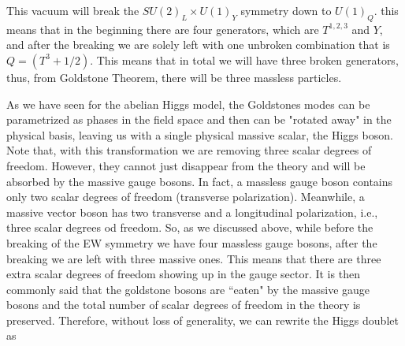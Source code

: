 This vacuum will break the $SU(2)_L \times U(1)_Y$ symmetry down to $U(1)_Q$. this means that in the beginning there are four generators, which are $T^{1,2,3}$ and $Y$, and after the breaking we are solely left with one unbroken combination that is $Q =  (T^3 + 1/2)$. This means that in total we will have three broken generators, thus, from Goldstone Theorem, there will be three massless particles. 

As we have seen for the abelian Higgs model, the Goldstones modes can be parametrized as phases in the field space and then can be "rotated away" in the physical basis, leaving us with a single physical massive scalar, the Higgs boson. Note that, with this transformation we are removing three scalar degrees of freedom.  However, they cannot just disappear from the theory and will be absorbed by the massive gauge bosons.
%
In fact, a massless gauge boson contains only two scalar degrees of freedom (transverse polarization). Meanwhile, a massive vector boson has two transverse and a longitudinal polarization, i.e., three scalar degrees od freedom. So, as we discussed above, while before the breaking of the EW symmetry we have four massless gauge bosons, after the breaking we are left with three massive ones. This means that there are three extra scalar degrees of freedom showing up in the gauge sector. It is then commonly said that the goldstone bosons are ``eaten" by the massive gauge bosons and the total number of scalar degrees of freedom in the theory is preserved. Therefore, without loss of generality, we can rewrite the Higgs doublet as

